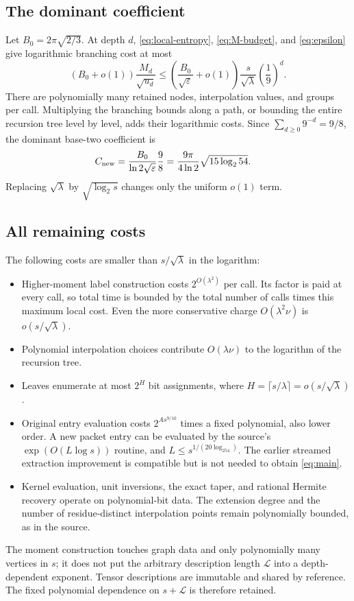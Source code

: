 \documentclass[11pt]{article}
\theoremstyle{remark}\newtheorem{remark}[theorem]{Remark}
\newcommand{\LL}{\mathcal L}
\newcommand{\Cnew}{C_{\rm new}}
\newcommand{\lp}{\log_2}
\begin{document}
\subsection{The dominant coefficient}
Let $B_0=2\pi\sqrt{2/3}$. At depth $d$, \eqref{eq:local-entropy}, \eqref{eq:M-budget}, and \eqref{eq:epsilon} give logarithmic branching cost at most
\[
 (B_0+o(1))\frac{M_d}{\sqrt{u_d}}
 \le\left(\frac{B_0}{\sqrt\varepsilon}+o(1)\right)
        \frac{s}{\sqrt\lambda}\left(\frac19\right)^d.
\]
There are polynomially many retained nodes, interpolation values, and groups per call. Multiplying the branching bounds along a path, or bounding the entire recursion tree level by level, adds their logarithmic costs. Since $\sum_{d\ge0}9^{-d}=9/8$, the dominant base-two coefficient is
\begin{align*}
 \Cnew
 &=\frac{B_0}{\ln2\sqrt\varepsilon}\frac98
 =\frac{9\pi}{4\ln2}\sqrt{15\lp54}.
\end{align*}
Replacing $\sqrt\lambda$ by $\sqrt{\lp s}$ changes only the uniform $o(1)$ term.

\subsection{All remaining costs}
The following costs are smaller than $s/\sqrt\lambda$ in the logarithm:
\begin{itemize}[leftmargin=*]
\item Higher-moment label construction costs $2^{O(\lambda^2)}$ per call. Its factor is paid at every call, so total time is bounded by the total number of calls times this maximum local cost. Even the more conservative charge $O(\lambda^2\nu)$ is $o(s/\sqrt\lambda)$.
\item Polynomial interpolation choices contribute $O(\lambda\nu)$ to the logarithm of the recursion tree.
\item Leaves enumerate at most $2^H$ bit assignments, where $H=\lceil s/\lambda\rceil=o(s/\sqrt\lambda)$.
\item Original entry evaluation costs $2^{As^{9/10}}$ times a fixed polynomial, also lower order. A new packet entry can be evaluated by the source's $\exp(O(L\log s))$ routine, and $L\le s^{1/(20\lp54)}$. The earlier streamed extraction improvement is compatible but is not needed to obtain \eqref{eq:main}.
\item Kernel evaluation, unit inversions, the exact taper, and rational Hermite recovery operate on polynomial-bit data. The extension degree and the number of residue-distinct interpolation points remain polynomially bounded, as in the source.
\end{itemize}
The moment construction touches graph data and only polynomially many vertices in $s$; it does not put the arbitrary description length $\LL$ into a depth-dependent exponent. Tensor descriptions are immutable and shared by reference. The fixed polynomial dependence on $s+\LL$ is therefore retained.
\end{document}
